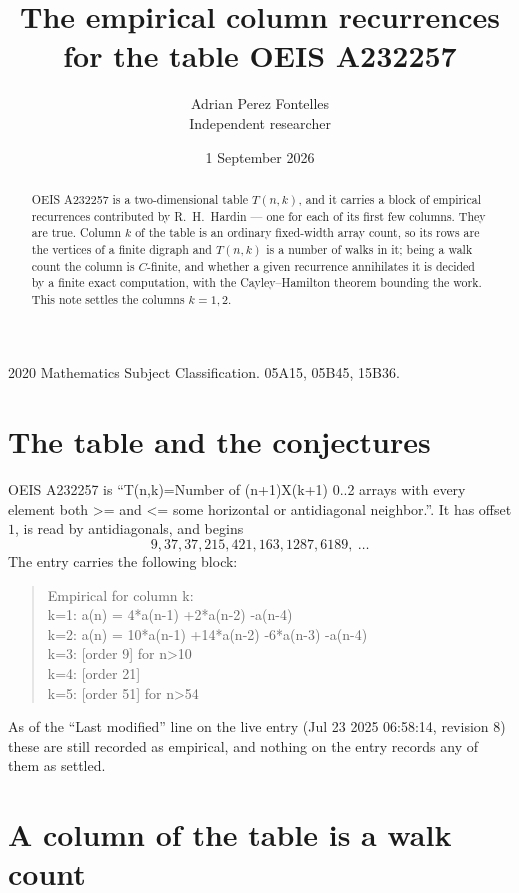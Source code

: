 \documentclass[11pt,a4paper]{article}
\title{The empirical column recurrences for the table OEIS A232257}
\author{Adrian Perez Fontelles\\ \small Independent researcher}
\date{1 September 2026}
\theoremstyle{plain}
\theoremstyle{definition}
\begin{document}
\maketitle

\begin{abstract}
OEIS A232257 is a two-dimensional table $T(n,k)$, and it carries a block of empirical
recurrences contributed by R.~H.~Hardin --- one for each of its first few columns. They are
true. Column $k$ of the table is an ordinary fixed-width array count, so its rows are the
vertices of a finite digraph and $T(n,k)$ is a number of walks in it; being a walk count the
column is $C$-finite, and whether a given recurrence annihilates it is decided by a finite
exact computation, with the Cayley--Hamilton theorem bounding the work. This note settles the columns $k=1, 2$.
\end{abstract}

\noindent\small 2020 Mathematics Subject Classification. 05A15, 05B45, 15B36.\normalsize

\section{The table and the conjectures}

OEIS A232257 is ``T(n,k)=Number of (n+1)X(k+1) 0..2 arrays with every element both >= and <= some horizontal or antidiagonal neighbor.''. It has offset $1$, is
read by antidiagonals, and begins
\[
9, 37, 37, 215, 421, 163, 1287, 6189,\ \dots
\]
The entry carries the following block:
\begin{quote}\small
Empirical for column k:\\
k=1: a(n) = 4*a(n-1) +2*a(n-2) -a(n-4)\\
k=2: a(n) = 10*a(n-1) +14*a(n-2) -6*a(n-3) -a(n-4)\\
k=3: [order 9] for n>10\\
k=4: [order 21]\\
k=5: [order 51] for n>54\\
\end{quote}
As of the ``Last modified'' line on the live entry (Jul 23 2025 06:58:14, revision 8) these are still
recorded as empirical, and nothing on the entry records any of them as settled.

\section{A column of the table is a walk count}
\end{document}
